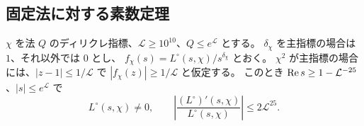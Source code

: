 \subsection{固定法に対する素数定理}

\begin{lemma}[対数微分の一様評価]\label{lem:uniform-log-derivative}
\(\chi\) を法 \(Q\) のディリクレ指標、\(\mathcal L\ge10^{10}\)、\(Q\le e^{\mathcal L}\) とする。
\(\delta_\chi\) を主指標の場合は \(1\)、それ以外では \(0\) とし、
\(f_\chi(s)=L^\circ(s,\chi)/s^{\delta_\chi}\) とおく。
\(\chi^2\) が主指標の場合には、\(|z-1|\le1/\mathcal L\) で
\(|f_\chi(z)|\ge1/\mathcal L\) と仮定する。
このとき \(\operatorname{Re} s\ge1-\mathcal L^{-25}\)、\(|s|\le e^{\mathcal L}\) で
\begin{equation}\label{eq:uniform-log-derivative}
  L^\circ(s,\chi)\ne0,\qquad
  \left|\frac{(L^\circ)'(s,\chi)}{L^\circ(s,\chi)}\right|\le2\mathcal L^{25}.
\end{equation}
\end{lemma}

